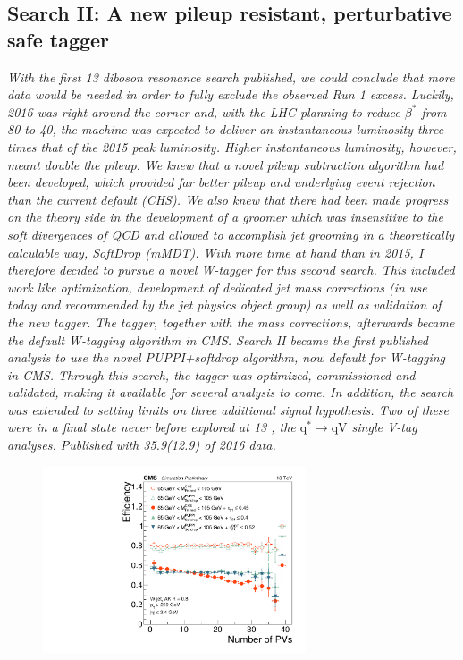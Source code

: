 \begin{singlespace}
\vspace*{\fill}
\begin{centering}
\section{Search II: A new pileup resistant, perturbative safe tagger}
\label{searchII}
\textit{
With the first 13 \TeV diboson resonance search published, we could conclude that more data would be needed in order to fully exclude the observed Run 1 excess. Luckily, 2016 was right around the corner and, with the LHC planning to reduce $\beta^*$ from 80 \cm to 40, the machine was expected to deliver an instantaneous luminosity three times that of the 2015 peak luminosity. Higher instantaneous luminosity, however, meant double the pileup.
\newline
\newline
We knew that a novel pileup subtraction algorithm had been developed, which provided far better pileup and underlying event rejection than the current default (CHS). We also knew that there had been made progress on the theory side in the development of a groomer which was insensitive to the soft divergences of QCD and allowed to accomplish jet grooming in a theoretically calculable way, SoftDrop (mMDT). With more time at hand than in 2015, I therefore decided to pursue a novel W-tagger for this second search. This included work like optimization, development of dedicated jet mass corrections (in use today and recommended by the jet physics object group) as well as validation of the new tagger. The tagger, together with the mass corrections, afterwards became the default W-tagging algorithm in CMS.
\newline
\newline
Search II became the first published analysis to use the novel PUPPI+softdrop algorithm, now default for W-tagging in CMS. Through this search, the tagger was optimized, commissioned and validated, making it available for several analysis to come. In addition, the search was extended to setting limits on three additional signal hypothesis. Two of these were in a final state never before explored at 13 \TeV, the $\textrm{q}^* \rightarrow \textrm{qV}$ single V-tag analyses. Published with 35.9(12.9) \fbinv of 2016 data.
}
\end{centering}
\begin{figure}[b!]
    \centering
    \includegraphics[height=5.5cm]{figures/vtagging/JME-16-003/BoostedW/WtagSigEffvsNPV.pdf}

\end{figure}
\end{singlespace}

